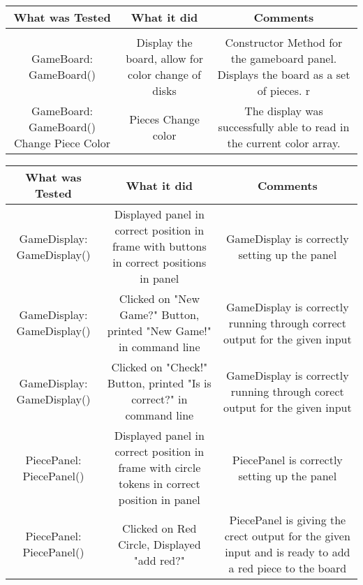 \documentclass[12pt]{article}
\begin{document}
	\begin{tabularx}{\linewidth}{|C|C|C|}
		What was Tested & What it did & Comments \\
		\hline \\
		GameBoard: GameBoard() & Display the board, allow for color change of disks & Constructor Method for the gameboard panel. Displays the board as a set of pieces. r \\
		GameBoard: GameBoard() Change Piece Color& Pieces Change color & The display was successfully able to read in the current color array. \\
	\end{tabularx}
	\begin{tabularx}{\linewidth}{|C|C|C|}
		What was Tested & What it did & Comments \\
		\hline 
		
		GameDisplay: GameDisplay() & Displayed panel in correct position in frame with buttons in correct positions in panel & GameDisplay is correctly setting up the panel \\
		GameDisplay: GameDisplay()& Clicked on "New Game?" Button,  printed "New Game!" in command line & GameDisplay is correctly running through correct output for the given input \\
		GameDisplay: GameDisplay() & Clicked on "Check!" Button, printed "Is is correct?" in command line & GameDisplay is correctly running through corect output for the given input \\
		PiecePanel: PiecePanel() & Displayed panel in correct position in frame with circle tokens in correct position in panel & PiecePanel is correctly setting up the panel \\
		PiecePanel: PiecePanel() & Clicked on Red Circle, Displayed "add red?" & PiecePanel is giving the crect output for the given input and is ready to add a red piece to the board \\
	\end{tabularx}
\end{document}
